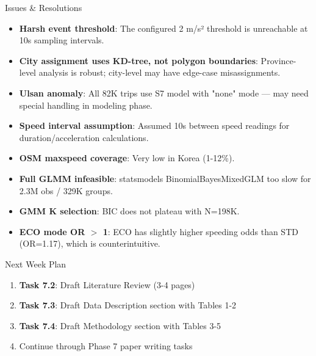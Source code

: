 \documentclass[aspectratio=169, 10pt]{beamer}
\begin{document}
\begin{frame}{Issues \& Resolutions}
\begin{itemize}\small
  \item \textbf{Harsh event threshold}: The configured 2 m/s² threshold is unreachable at 10s sampling intervals.
  \item \textbf{City assignment uses KD-tree, not polygon boundaries}: Province-level analysis is robust; city-level may have edge-case misassignments.
  \item \textbf{Ulsan anomaly}: All 82K trips use S7 model with "none" mode — may need special handling in modeling phase.
  \item \textbf{Speed interval assumption}: Assumed 10s between speed readings for duration/acceleration calculations.
  \item \textbf{OSM maxspeed coverage}: Very low in Korea (1-12\%).
  \item \textbf{Full GLMM infeasible}: statsmodels BinomialBayesMixedGLM too slow for 2.3M obs / 329K groups.
  \item \textbf{GMM K selection}: BIC does not plateau with N=198K.
  \item \textbf{ECO mode OR $>$ 1}: ECO has slightly higher speeding odds than STD (OR=1.17), which is counterintuitive.
\end{itemize}
\end{frame}

\begin{frame}{Next Week Plan}
\begin{enumerate}
  \item \textbf{Task 7.2}: Draft Literature Review (3-4 pages)
  \item \textbf{Task 7.3}: Draft Data Description section with Tables 1-2
  \item \textbf{Task 7.4}: Draft Methodology section with Tables 3-5
  \item Continue through Phase 7 paper writing tasks
\end{enumerate}
\end{frame}
\end{document}
